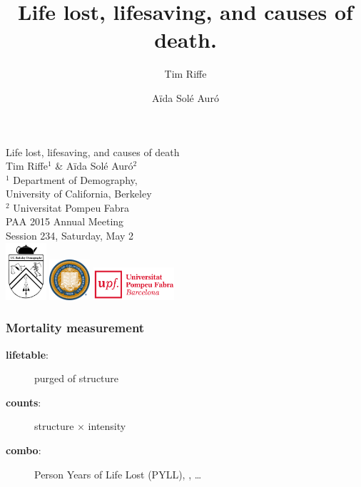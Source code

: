 \documentclass{beamer}
\title[Years Lost]{Life lost, lifesaving, and causes of death.}
\author[Riffe \& Sol\'{e}]
{
Tim Riffe \inst{1} \and A{\"i}da Sol\'{e} Aur\'{o} \inst{2}}
\institute %
{
  \inst{1}%
  Department of Demography, \\
  University of California, Berkeley \\
  \and
  \inst{2} Universitat Pompeu Fabra
}
\begin{document}

\begin{frame}[plain]

\vspace{3em}
\LARGE Life lost, lifesaving, and causes of death\\
\vspace{3 mm}
\normalsize Tim Riffe$^1$ \& A{\"i}da Sol\'{e} Aur\'{o}$^2$\\
\vspace{3 mm}
 $^1$ Department of Demography, \\
  \hspace{2mm} University of California, Berkeley \\
  $^2$ Universitat Pompeu Fabra\\
  \vspace{5 mm}
  PAA 2015 Annual Meeting \\
  Session 234, Saturday, May 2\\
  \vspace{10 mm}
  \includegraphics[width=1.5cm]{Figures/demogcrest}\hspace{.5cm}
  \includegraphics[width=1.5cm]{Figures/ucbseal1}\hspace{3cm}
  \includegraphics[height=1.2cm]{Figures/UPFcmyk}
\end{frame}


\begin{frame}
\frametitle{Mortality measurement}
\begin{description}
\item[\textbf{lifetable}:] purged of structure
\item[\textbf{counts}:] structure $\times$ intensity
\item[\textbf{combo}:] Person Years of Life Lost (PYLL),
\underline{\hspace{1cm}},
\ldots
\end{description}

\end{frame}
\end{document}
